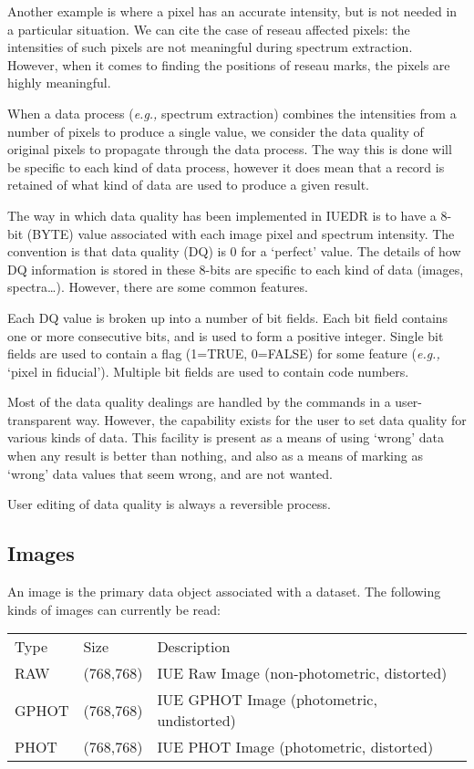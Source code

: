Another example is where a pixel has an accurate intensity, but is not
needed in a particular situation.  We can cite the case of reseau affected
pixels: the intensities of such pixels are not meaningful during spectrum
extraction.  However, when it comes to finding the positions of reseau marks,
the pixels are highly meaningful.

When a data process ({\it{e.g.,}} spectrum extraction) combines the intensities
from a number of pixels to produce a single value, we consider the data
quality of original pixels to propagate through the data process.  The way
this is done will be specific to each kind of data process, however it does
mean that a record is retained of what kind of data are used to produce a
given result.

The way in which data quality has been implemented in IUEDR is to have a
8-bit (BYTE) value associated with each image pixel and spectrum
intensity.  The convention is that data quality (DQ) is 0 for a `perfect'
value.  The details of how DQ information is stored in these 8-bits are
specific to each kind of data (images, spectra\ldots)\@.  However, there are
some common features.

Each DQ value is broken up into a number of bit fields.  Each bit field
contains one or more consecutive bits, and is used to form a positive
integer.  Single bit fields are used to contain a flag (1=TRUE,
0=FALSE) for some feature ({\it{e.g.,}} `pixel in fiducial')\@.
Multiple bit fields are used to contain code numbers.

Most of the data quality dealings are handled by the commands in a
user-transparent way.  However, the capability exists for the user to set data
quality for various kinds of data.  This facility is present as a
means of using `wrong' data when any result is better than nothing, and also
as a means of marking as `wrong' data values that seem wrong, and are not
wanted.

User editing of data quality is always a reversible process.


\subsection{Images}

An image is the primary data object associated with a dataset.  The
following kinds of images can currently be read:

\begin{latexonly}
\begin{tabular}{lll}
Type   & Size      & Description \\
RAW    & (768,768) & IUE Raw Image (non-photometric, distorted)\\
GPHOT  & (768,768) & IUE GPHOT Image (photometric, undistorted)\\
PHOT   & (768,768) & IUE PHOT Image (photometric, distorted)\\
\end{tabular}
\end{latexonly}

